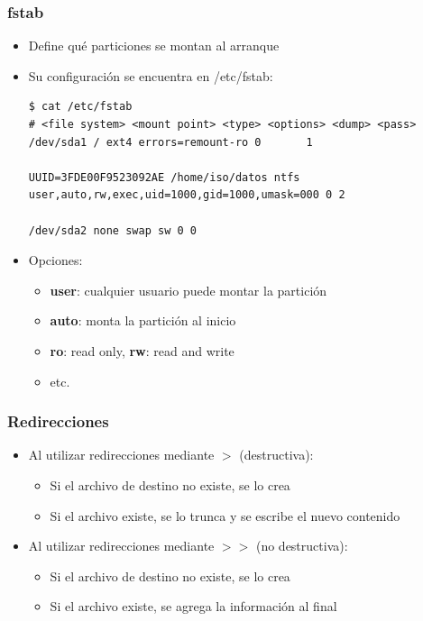 \begin{frame}[fragile]
  	\frametitle{\textbf{fstab}}
  	\begin{itemize}
		\item Define qué particiones se montan al arranque
		\item Su configuración se encuentra en /etc/fstab:
		\begin{lstlisting}
$ cat /etc/fstab
# <file system> <mount point> <type> <options> <dump> <pass>
/dev/sda1 / ext4 errors=remount-ro 0       1

UUID=3FDE00F9523092AE /home/iso/datos ntfs user,auto,rw,exec,uid=1000,gid=1000,umask=000 0 2

/dev/sda2 none swap sw 0 0
		\end{lstlisting}
		\item Opciones:
		\begin{itemize}
			\item \textbf{user}: cualquier usuario puede montar la partición
			\item \textbf{auto}: monta la partición al inicio
			\item \textbf{ro}: read only, \textbf{rw}: read and write
			\item etc.
		\end{itemize}
  	\end{itemize}
\end{frame}

\begin{frame}
  	\frametitle{Redirecciones}
  	\begin{itemize}
		\item Al utilizar redirecciones mediante \textbf{$>$} (destructiva):
		\begin{itemize}
			\item Si el archivo de destino no existe, se lo crea
			\item Si el archivo existe, se lo trunca y se escribe el nuevo contenido
		\end{itemize}
		\item Al utilizar redirecciones mediante \textbf{$>>$} (no destructiva):
		\begin{itemize}
			\item Si el archivo de destino no existe, se lo crea
			\item Si el archivo existe, se agrega la información al final
		\end{itemize}
  	\end{itemize}
\end{frame}

